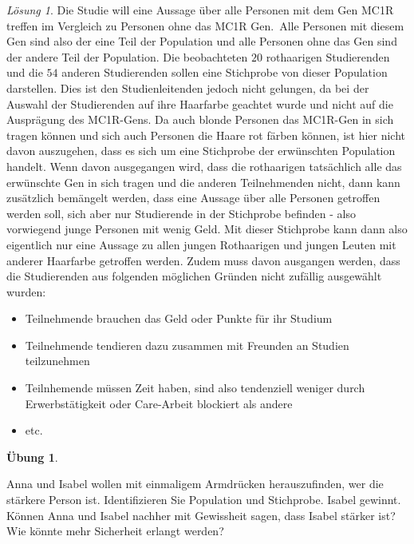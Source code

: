 \documentclass[
]{book}
\providecommand{\tightlist}{%
  \setlength{\itemsep}{0pt}\setlength{\parskip}{0pt}}
\theoremstyle{definition}
\theoremstyle{definition}
\theoremstyle{definition}
\newtheorem{exercise}{Übung}[chapter]
\theoremstyle{definition}
\theoremstyle{remark}
\newtheorem*{solution}{Lösung}
\begin{document}
\begin{solution}

Die Studie will eine Aussage über alle Personen mit dem Gen MC1R treffen im Vergleich zu Personen ohne das MC1R Gen.~Alle Personen mit diesem Gen sind also der eine Teil der Population und alle Personen ohne das Gen sind der andere Teil der Population. Die beobachteten \(20\) rothaarigen Studierenden und die \(54\) anderen Studierenden sollen eine Stichprobe von dieser Population darstellen. Dies ist den Studienleitenden jedoch nicht gelungen, da bei der Auswahl der Studierenden auf ihre Haarfarbe geachtet wurde und nicht auf die Ausprägung des MC1R-Gens. Da auch blonde Personen das MC1R-Gen in sich tragen können und sich auch Personen die Haare rot färben können, ist hier nicht davon auszugehen, dass es sich um eine Stichprobe der erwünschten Population handelt. Wenn davon ausgegangen wird, dass die rothaarigen tatsächlich alle das erwünschte Gen in sich tragen und die anderen Teilnehmenden nicht, dann kann zusätzlich bemängelt werden, dass eine Aussage über alle Personen getroffen werden soll, sich aber nur Studierende in der Stichprobe befinden - also vorwiegend junge Personen mit wenig Geld. Mit dieser Stichprobe kann dann also eigentlich nur eine Aussage zu allen jungen Rothaarigen und jungen Leuten mit anderer Haarfarbe getroffen werden. Zudem muss davon ausgangen werden, dass die Studierenden aus folgenden möglichen Gründen nicht zufällig ausgewählt wurden:

\begin{itemize}
\tightlist
\item
  Teilnehmende brauchen das Geld oder Punkte für ihr Studium
\item
  Teilnehmende tendieren dazu zusammen mit Freunden an Studien teilzunehmen
\item
  Teilnhemende müssen Zeit haben, sind also tendenziell weniger durch Erwerbstätigkeit oder Care-Arbeit blockiert als andere
\item
  etc.
\end{itemize}

\end{solution}

\begin{exercise}
\protect\hypertarget{exr:armwrestling}{}\label{exr:armwrestling}\leavevmode

Anna und Isabel wollen mit einmaligem Armdrücken herauszufinden, wer die stärkere Person ist. Identifizieren Sie Population und Stichprobe. Isabel gewinnt. Können Anna und Isabel nachher mit Gewissheit sagen, dass Isabel stärker ist? Wie könnte mehr Sicherheit erlangt werden?

\end{exercise}
\end{document}
